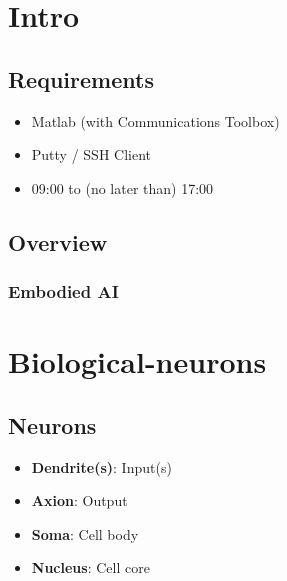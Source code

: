 \documentclass[
    fontsize      = 11pt,
    paper         = a4,
    twoside       = false,
    parskip       = half,
    pagesize      = false,
]{scrartcl}
\author{Robin Prillwitz}
\date{14 August 2022}
\providecommand{\tightlist}{%
  \setlength{\itemsep}{0pt}\setlength{\parskip}{0pt}}
\begin{document}
\tableofcontents

\clearpage
\newpage

\hypertarget{intro}{%
\section{Intro}\label{intro}}

\hypertarget{requirements}{%
\subsection{Requirements}\label{requirements}}

\begin{itemize}
\tightlist
\item
  Matlab (with Communications Toolbox)
\item
  Putty / SSH Client
\item
  09:00 to (no later than) 17:00
\end{itemize}

\hypertarget{overview}{%
\subsection{Overview}\label{overview}}

\hypertarget{embodied-ai}{%
\subsubsection{Embodied AI}\label{embodied-ai}}

\clearpage
\newpage

\hypertarget{biological-neurons}{%
\section{Biological-neurons}\label{biological-neurons}}

\hypertarget{neurons}{%
\subsection{Neurons}\label{neurons}}

\begin{itemize}
\tightlist
\item
  \textbf{Dendrite(s)}: Input(s)
\item
  \textbf{Axion}: Output
\item
  \textbf{Soma}: Cell body
\item
  \textbf{Nucleus}: Cell core
\end{itemize}
\end{document}
